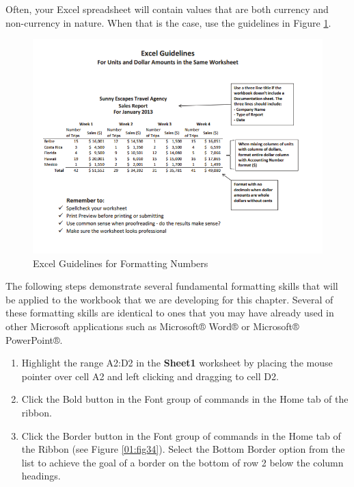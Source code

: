 Often, your Excel spreadsheet will contain values that are both currency and non-currency in nature. When that is the case, use the guidelines in Figure \ref{01:fig33}.

\begin{figure}[H]
	\centering
	\includegraphics[width=\maxwidth{.95\linewidth}]{gfx/ch01_fig33}
	\caption{Excel Guidelines for Formatting Numbers}
	\label{01:fig33}
\end{figure}

The following steps demonstrate several fundamental formatting skills that will be applied to the workbook that we are developing for this chapter. Several of these formatting skills are identical to ones that you may have already used in other Microsoft applications such as Microsoft® Word® or
Microsoft® PowerPoint®.

\begin{enumerate}
	\item Highlight the range \textsf{A2:D2} in the \textbf{Sheet1} worksheet by placing the mouse pointer over cell \textsf{A2} and left clicking and dragging to cell \textsf{D2}. 
	\item Click the Bold button in the Font group of commands in the Home tab of the ribbon.
	\item Click the Border button in the Font group of commands in the Home tab of the Ribbon (see Figure \ref{01:fig34}). Select the Bottom Border option from the list to achieve the goal of a border on the bottom of row 2 below the column headings.
\end{enumerate}

